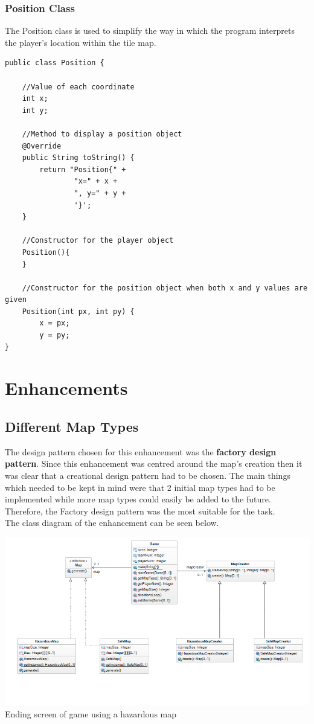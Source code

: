 \documentclass[a4paper,12pt]{extarticle}
\begin{document}
\subsubsection{Position Class}

The Position class is used to simplify the way in which the program interprets the player's location within the tile map.

\begin{lstlisting}[caption=The initial code of the Position class]
public class Position {

    //Value of each coordinate
    int x;
    int y;

    //Method to display a position object
    @Override
    public String toString() {
        return "Position{" +
                "x=" + x +
                ", y=" + y +
                '}';
    }

    //Constructor for the player object
    Position(){
    }

    //Constructor for the position object when both x and y values are given
    Position(int px, int py) {
        x = px;
        y = py;
}
\end{lstlisting}

\newpage
\section{Enhancements}
\subsection{Different Map Types}

The design pattern chosen for this enhancement was the \textbf{factory design pattern}. Since this enhancement was centred around the map's creation then it was clear that a creational design pattern had to be chosen. The main things which needed to be kept in mind were that 2 initial map types had to be implemented while more map types could easily be added to the future. Therefore, the Factory design pattern was the most suitable for the task.\\

The class diagram of the enhancement can be seen below.\\

\begin{center}
\includegraphics[scale=0.5]{Enhancement1CD.png}\\
Ending screen of game using a hazardous map
\end{center}
\end{document}

